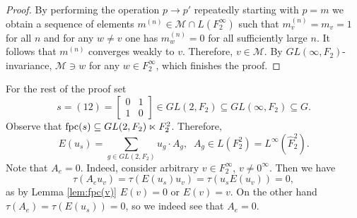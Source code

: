 \documentclass[11pt]{amsart}
\newcommand{\fpc}{{\rm fpc}}
\theoremstyle{plain}
\theoremstyle{definition}
\theoremstyle{remark}
\numberwithin{equation}{section}
\begin{document}
\begin{proof}
By performing the operation $p\to p'$ repeatedly starting with $p=m$ we obtain a sequence of elements $m^{(n)}\in \mathcal M\cap L(F_2^\infty)$ such that $m^{(n)}_v=m_v=1$ for all $n$ and for any $w\neq v$ one has $m^{(n)}_w=0$ for all sufficiently large $n$. It follows that $m^{(n)}$ converges weakly to $v$. Therefore, $v\in \mathcal M$. By $GL(\infty,F_2)$-invariance, $\mathcal M\ni w$ for any $w\in F_2^\infty$, which finishes the proof.
\end{proof}



For the rest of the proof set
\begin{equation}\label{eq: s = 01 10}
	s=(12)=\begin{bmatrix}0&1\\1&0\end{bmatrix}\in GL(2, F_2)\subseteq GL(\infty, F_2)\subseteq G.
\end{equation}
Observe that $\fpc(s)\subseteq GL(2, F_2)\ltimes F_2^2$. Therefore,
\begin{equation}\label{eq:E(01_10)}E(u_s)=\sum\limits_{g\in GL(2, F_2)}u_g\cdot A_g,\;\;A_g\in L( F_2^2)=L^\infty(\widehat{ F}_2^2).\end{equation} 
Note that $A_e=0$. Indeed, consider arbitrary $v\in F_2^{\infty}$, $v \neq 0^\infty$. Then we have 
\[\tau(A_eu_v) = \tau(E(u_s) u_v) = \tau(u_sE(u_v)) =0,\]
as  by Lemma \ref{lem:fpc(v)}  $E(v)=0$ or $E(v)=v$. On the other hand $\tau(A_e)=\tau(E(u_s))=0$, so we indeed see that $A_e =0$.
\end{document}
